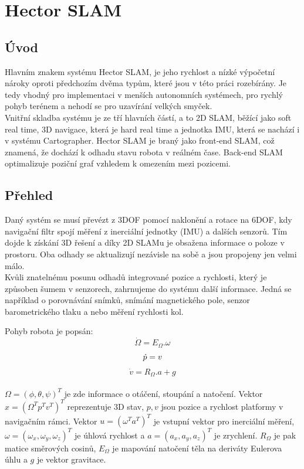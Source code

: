 \documentclass[11pt]{article}
\begin{document}
\newpage

\section{Hector SLAM}

\subsection{Úvod}
Hlavním znakem systému Hector SLAM, je jeho rychlost a nízké výpočetní nároky oproti předchozím dvěma typům, které jsou v této práci rozebírány. Je tedy vhodný pro implementaci v menších autonomních systémech, pro rychlý pohyb terénem a nehodí se pro uzavírání velkých smyček.\\
\indent Vnitřní skladba systému je ze tří hlavních částí, a to 2D SLAM, běžící jako soft real time, 3D navigace, která je hard real time a jednotka IMU, která se nachází i v systému Cartographer. Hector SLAM je braný jako front-end SLAM, což znamená, že dochází k odhadu stavu robota v reálném čase. Back-end SLAM optimalizuje poziční graf vzhledem k omezením mezi pozicemi.

\subsection{Přehled}
Daný systém se musí převézt z 3DOF pomocí naklonění a rotace na 6DOF, kdy navigační filtr spojí měření z inerciální jednotky (IMU) a dalších senzorů. Tím dojde k získání 3D řešení a díky 2D SLAMu je obsažena informace o poloze v prostoru. Oba odhady se aktualizují nezávisle na sobě a jsou propojeny jen velmi málo.\\
\indent Kvůli znatelnému posunu odhadů integrované pozice a rychlosti, který je způsoben šumem v senzorech, zahrnujeme do systému další informace. Jedná se například o porovnávání snímků, snímání magnetického pole, senzor barometrického tlaku a nebo měření rychlosti kol.

Pohyb robota je popsán:
\begin{equation}
	\dot{\Omega}=E_\Omega.\omega
\end{equation}
\begin{equation}
	\dot{p}=v\\
\end{equation}
\begin{equation}
	\dot{v}=R_\Omega.a+g
\end{equation}\\
$\Omega=(\phi,\theta,\psi)^T$ je zde informace o otáčení, stoupání a natočení. Vektor $x=(\Omega^T p^T v^T)^T$ reprezentuje 3D stav, $p,v$ jsou pozice a rychlost platformy v navigačním rámci. Vektor $u=(\omega^T a^T)^T$ je vstupní vektor pro inerciální měření, $\omega=(\omega_x,\omega_y,\omega_z)^T$ je úhlová rychlost a $a=(a_x,a_y,a_z)^T$ je zrychlení. $R_\Omega$ je pak matice směrových cosinů, $E_\Omega$ je mapování natočení těla na deriváty Eulerova úhlu a $g$ je vektor gravitace.\\
\end{document}
